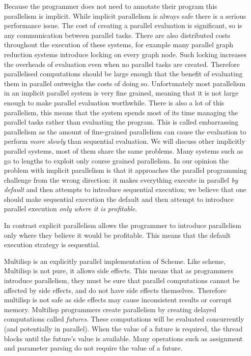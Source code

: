 Because the programmer does not need to annotate their program this
parallelism is implicit.
While implicit parallelism is always safe there is a serious performance
issue.
The cost of creating a parallel evaluation is significant,
so is any communication between parallel tasks.
There are also distributed costs throughout the execution of these systems,
for example many parallel graph reduction systems introduce locking on every
graph node.
Such locking increases the overheads of evaluation even when no parallel
tasks are created.
Therefore parallelised computations should be large enough that the benefit
of evaluating them in parallel outweighs the costs of doing so.
Unfortunately most parallelism in an implicit parallel system is very
fine grained, meaning that it is not large enough to make parallel
evaluation worthwhile.
There is also a lot of this parallelism,
this means that the system spends most of its time managing the parallel
tasks rather than evaluating the program.
This is called embarrassing parallelism as the amount of fine-grained
parallelism can cause the evaluation to perform \emph{more slowly} than
sequential evaluation.
We will discuss other implicitly parallel systems,
most of them share the same problems.
Many systems such as \citet{peyton-jones:1989:parallel-graph-reduction} go
to lengths to exploit only course grained parallelism.
In our opinion the problem with implicit parallelism is that it approaches
the parallel programming challenge from the wrong direction:
it makes everything execute in parallel \emph{by default} and then attempts
to introduce sequential execution;
we believe that one should make sequential execution the default and then
attempt to introduce parallel execution \emph{only where it is profitable}.

In contrast explicit parallelism allows the programmer to introduce
parallelism only where they believe it would be profitable.
This means that the default execution strategy is sequential.

Multilisp \citep{halstead:1984:multilisp,halstead:1985:multilisp} is an
explicitly parallel implementation of Scheme.
Like scheme, Multilisp is not pure, it allows side effects.
This means that as programmers introduce parallelism, they must be sure that
parallel computations cannot be affected by side effects,
and do not have side effects themselves.
Therefore multilisp is not safe as side effects may cause inconsistent
results or corrupt memory.
Multilisp programmers create parallelism by creating delayed computations
called \emph{futures}.
These computations will be evaluated concurrently 
(and potentially in parallel).
When the value of a future is required,
the thread blocks until the future's value is available.
Many operations such as assignment and parameter parsing do not require the
value of a future.

